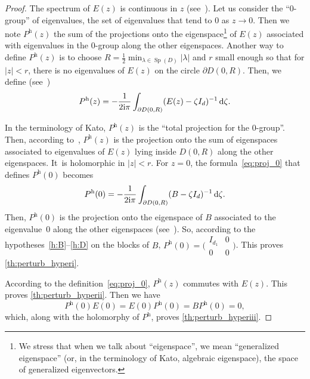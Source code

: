 \documentclass[JEP,XML,SOM,Unicode,NoEqCountersInSection]{cedram}
\theoremstyle{plain}
\theoremstyle{definition}
\theoremstyle{remark}
\DeclareMathOperator{\Sp}{Sp}
\newcommand{\diff}[1][-3]{\ensuremath{\mathop{}\mkern#1mu\mathrm{d}}}
\newcommand{\h}{{\mathrm h}}
\newcommand{\iu}{\mathrm i}
\begin{document}
\begin{proof}
The spectrum of $E(z)$ is continuous in $z$ (see~\cite[Ch.\,II, \S1.2]{kato_1995}). Let us consider the ``$0$-group'' of eigenvalues, \ie the set of eigenvalues that tend to $0$ as $z\to 0$. Then we note $P^\h(z)$ the sum of the projections onto the eigenspace\footnote{We stress that when we talk about ``eigenspace'', we mean ``generalized eigenspace'' (or, in the terminology of Kato, algebraic eigenspace), \ie the space of generalized eigenvectors.} of $E(z)$ associated with eigenvalues in the $0$-group along the other eigenspaces. Another way to define $P^\h(z)$ is to choose $R=\frac12 \min_{\lambda\in\Sp(D)} |\lambda|$ and $r$ small enough so that for $|z|<r$, there is no eigenvalues of $E(z)$ on the circle $\partial D(0,R)$. Then, we define (see~\cite[Ch.\,II, Eq.\,(1.16)]{kato_1995})
\begin{equation}\label{eq:proj_0}
P^\h(z) = -\frac1{2\iu\pi}\int_{\partial D(0,R)} (E(z)-\zeta I_d)^{-1}\diff \zeta.
\end{equation}

In the terminology of Kato, $P^\h(z)$ is the ``total projection for the $0$-group''. Then, according to~\cite[Ch.\,II, \S1.4]{kato_1995}, $P^\h(z)$ is the projection onto the sum of eigenspaces associated to eigenvalues of $E(z)$ lying inside $D(0,R)$ along the other eigenspaces. It~is holomorphic in $|z|<r$. For $z=0$, the formula~\eqref{eq:proj_0} that defines $P^\h(0)$ becomes
\[
P^\h(0) = -\frac1{2\iu\pi}\int_{\partial D(0,R)} (B-\zeta I_d)^{-1}\diff \zeta.
\]
Then, $P^\h(0)$ is the projection onto the eigenspace of $B$ associated to the eigenvalue~$0$ along the other eigenspaces (see~\cite[Ch.\,II, \S1.4]{kato_1995}). So, according to the hypotheses~\eqref{h:B}--\eqref{h:D} on the blocks of $B$, $P^\h(0) = \big(\begin{smallmatrix}I_{d_1}&0\\0&0 \end{smallmatrix} \big)$. This proves \eqref{th:perturb_hyperi}.

According to the definition~\eqref{eq:proj_0}, $P^\h(z)$ commutes with $E(z)$. This proves \eqref{th:perturb_hyperii}. Then we have
\[
P^\h(0)E(0) = E(0)P^\h(0) = BP^\h(0) = 0,
\]
which, along with the holomorphy of $P^\h$, proves \eqref{th:perturb_hyperiii}.
\end{proof}
\end{document}
